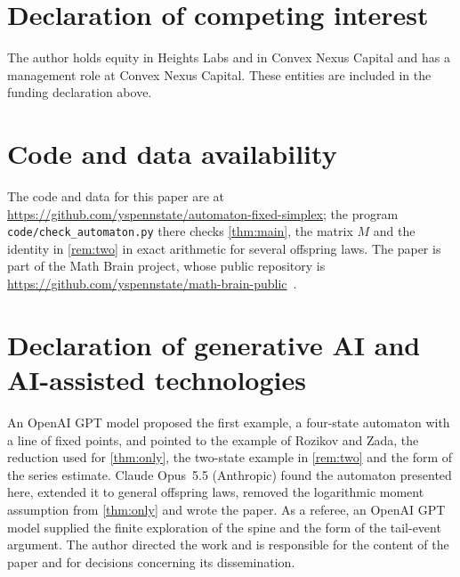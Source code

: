 \documentclass[11pt]{amsart}
\theoremstyle{remark}
\begin{document}
\section*{Declaration of competing interest}
The author holds equity in Heights Labs and in Convex Nexus Capital and has a management role at Convex Nexus Capital. These entities are included in the funding declaration above.

\section*{Code and data availability}
The code and data for this paper are at \url{https://github.com/yspennstate/automaton-fixed-simplex}; the program \texttt{code/check\_automaton.py} there checks \cref{thm:main}, the matrix $M$ and the identity in \cref{rem:two} in exact arithmetic for several offspring laws. The paper is part of the Math Brain project, whose public repository is \url{https://github.com/yspennstate/math-brain-public}~\cite{MathBrainRepo}.

\section*{Declaration of generative AI and AI-assisted technologies}
An OpenAI GPT model proposed the first example, a four-state automaton with a line of fixed points, and pointed to the example of Rozikov and Zada, the reduction used for \cref{thm:only}, the two-state example in \cref{rem:two} and the form of the series estimate. Claude Opus~5.5 (Anthropic) found the automaton presented here, extended it to general offspring laws, removed the logarithmic moment assumption from \cref{thm:only} and wrote the paper. As a referee, an OpenAI GPT model supplied the finite exploration of the spine and the form of the tail-event argument. The author directed the work and is responsible for the content of the paper and for decisions concerning its dissemination.

\appendix




\end{document}
